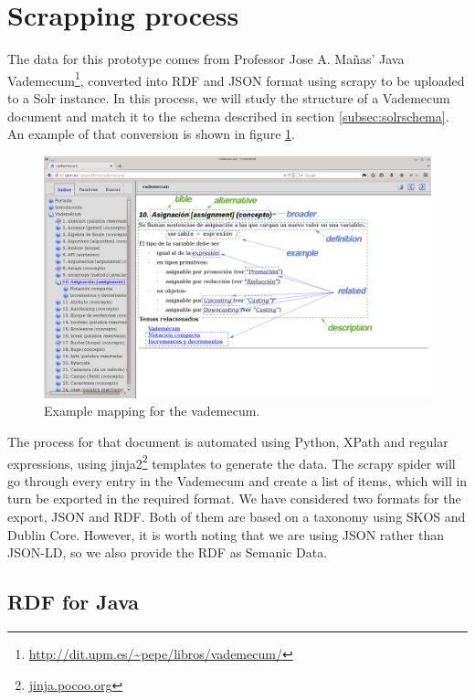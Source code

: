 \section{Scrapping process}
\label{sec:javascrapping}

The data for this prototype comes from Professor Jose A. Mañas' Java Vademecum\footnote{\url{http://dit.upm.es/~pepe/libros/vademecum/}}, converted into \ac{RDF} and JSON format using scrapy to be uploaded to a Solr instance. In this process, we will study the structure of a Vademecum document and match it to the schema described in section \ref{subsec:solrschema}. An example of that conversion is shown in figure \ref{fig:vademecum1}.

\begin{figure}[!htbp]
    \centering
    \includegraphics[width=\textwidth]{img/screens/vademecum-ex.png}
    \caption{Example mapping for the vademecum.}
    \label{fig:vademecum1}
\end{figure}

The process for that document is automated using Python, XPath and regular expressions, using jinja2\footnote{\url{jinja.pocoo.org}} templates to generate the data. The scrapy spider will go through every entry in the Vademecum and create a list of items, which will in turn be exported in the required format. We have considered two formats for the export, JSON and \ac{RDF}. Both of them are based on a taxonomy using SKOS and Dublin Core. However, it is worth noting that we are using JSON rather than JSON-LD, so we also provide the \ac{RDF} as Semanic Data.

\subsection{RDF for Java}

